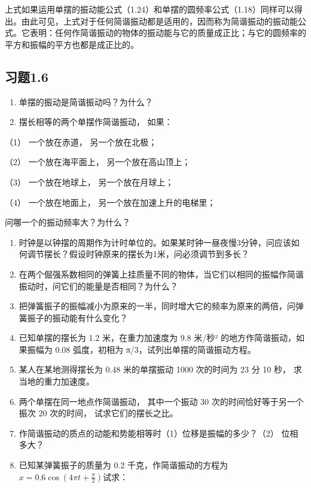 上式如果运用单摆的振动能公式（1.24）和单摆的圆频率公式（1.18）同样可以得出。由此可见，上式对于任何简谐振动都是适用的，因而称为简谐振动的振动能公式。它表明：任何作简谐振动的物体的振动能与它的质量成正比；与它的圆频率的平方和振幅的平方也都是成正比的。

\subsection{习题1.6}\label{ux4e60ux98981.6}

\begin{enumerate}
\def\labelenumi{\arabic{enumi}.}
\item
  单摆的振动是简谐振动吗？为什么？
\item
  摆长相等的两个单摆作简谐振动， 如果：
\end{enumerate}

（1） 一个放在赤道， 另一个放在北极；

（2） 一个放在海平面上， 另一个放在高山顶上；

（3） 一个放在地球上， 另一个放在月球上；

（4） 一个放在地面上， 另一个放在加速上升的电梯里；

问哪一个的振动频率大？为什么？

\begin{enumerate}
\def\labelenumi{\arabic{enumi}.}
\setcounter{enumi}{2}
\item
  时钟是以钟摆的周期作为计时单位的。如果某时钟一昼夜慢3分钟，问应该如何调节摆长？假设时钟原来的摆长为1米，问必须调节到多长？
\item
  在两个倔强系数相同的弹簧上挂质量不同的物体，当它们以相同的振幅作简谐振动时，问它们的能量是否相同？为什么？
\item
  把弹簧振子的振幅减小为原来的一半，同时增大它的频率为原来的两倍，问弹簧振子的振动能有什么变化？
\item
  已知单摆的摆长为 1.2 米，在重力加速度为 9.8 米/秒²
  的地方作简谐振动，如果振幅为 0.08 弧度，初相为
  π/3，试列出单摆的简谐振动方程。
\item
  某人在某地测得摆长为 0.48 米的单摆振动 1000 次的时间为 23 分 10 秒，
  求当地的重力加速度。
\item
  两个单摆在同一地点作简谐振动， 其中一个振动 30
  次的时间恰好等于另一个振次 20 次的时间， 试求它们的摆长之比。
\item
  作简谐振动的质点的动能和势能相等时（1）位移是振幅的多少？（2）
  位相多大？
\item
  已知某弹簧振子的质量为 0.2
  千克，作简谐振动的方程为\(x = 0.6 \cos \left(4\pi t + \frac{\pi}{2}\right)\)试求：
\end{enumerate}

